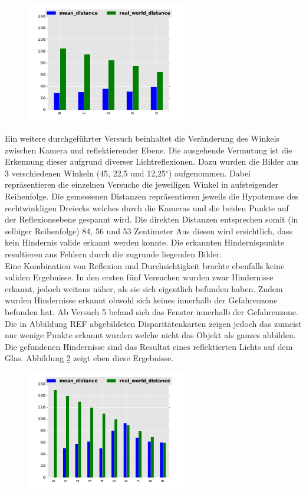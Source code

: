 \begin{figure}[h]
	\centering
	\includegraphics[width=7cm]{img/reflection/reflection_bar}
	\caption{}
	\label{fig:reflection_only}	
\end{figure}

\noindent
Ein weitere durchgeführter Versuch beinhaltet die Veränderung des Winkels zwischen Kamera und reflektierender Ebene. Die ausgehende Vermutung ist die Erkennung dieser aufgrund diverser Lichtreflexionen. Dazu wurden die Bilder aus 3 verschiedenen Winkeln (45, 22,5 und 12,25$^\circ$) aufgenommen.
 Dabei repräsentieren die einzelnen Versuche die jeweiligen Winkel in aufsteigender Reihenfolge. Die gemessenen Distanzen repräsentieren jeweils die Hypotenuse des rechtwinkligen Dreiecks welches durch die Kameras und die beiden Punkte auf der Reflexionsebene gespannt wird. Die direkten Distanzen entsprechen somit (in selbiger Reihenfolge) 84, 56 und 53 Zentimeter 
\noindent
Aus diesen wird ersichtlich, dass kein Hindernis valide erkannt werden konnte. Die erkannten Hindernispunkte resultieren aus Fehlern durch die zugrunde liegenden Bilder.\\

\noindent
Eine Kombination von Reflexion und Durchsichtigkeit brachte ebenfalls keine validen Ergebnisse. In den ersten fünf Versuchen wurden zwar Hindernisse erkannt, jedoch weitaus näher, als sie sich eigentlich befunden haben. Zudem wurden Hindernisse erkannt obwohl  sich keines innerhalb der Gefahrenzone befunden hat. Ab Versuch 5 befand sich das Fenster innerhalb der Gefahrenzone. Die in Abbildung REF abgebildeten Disparitätenkarten zeigen jedoch das zumeist nur wenige Punkte erkannt wurden welche nicht das Objekt als ganzes abbilden. Die gefundenen Hindernisse sind das Resultat eines reflektierten Lichts auf dem Glas. Abbildung \ref{fig:combined} zeigt eben diese Ergebnisse. 

\begin{figure}
	\centering
	\includegraphics[width=7cm]{img/reflection/combined_bar}
	\caption{}
	\label{fig:combined}
\end{figure} 

